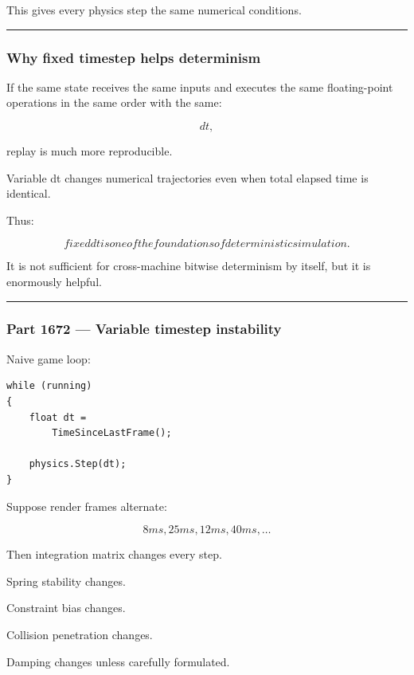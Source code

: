 This gives every physics step the same numerical conditions.

\begin{center}\rule{0.5\linewidth}{0.5pt}\end{center}

\subsubsection{Why fixed timestep helps determinism}\label{why-fixed-timestep-helps-determinism}

If the same state receives the same inputs and executes the same floating-point operations in the same order with the same:

\[
dt,
\]

replay is much more reproducible.

Variable dt changes numerical trajectories even when total elapsed time is identical.

Thus:

\[
\boxed{
fixed dt is one of the foundations of deterministic simulation.
}
\]

It is not sufficient for cross-machine bitwise determinism by itself, but it is enormously helpful.

\begin{center}\rule{0.5\linewidth}{0.5pt}\end{center}

\subsubsection{Part 1672 --- Variable timestep instability}\label{part-1672-variable-timestep-instability}

Naive game loop:

\begin{verbatim}
while (running)
{
    float dt =
        TimeSinceLastFrame();

    physics.Step(dt);
}
\end{verbatim}

Suppose render frames alternate:

\[
8ms,25ms,12ms,40ms,\dots
\]

Then integration matrix changes every step.

Spring stability changes.

Constraint bias changes.

Collision penetration changes.

Damping changes unless carefully formulated.

